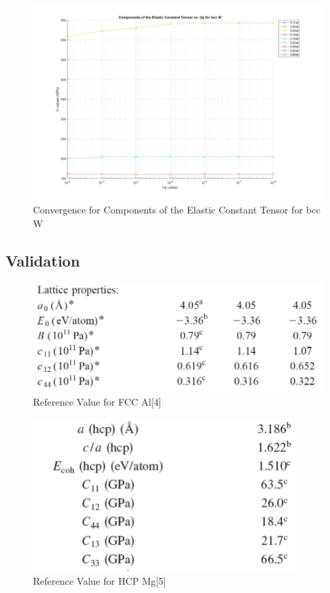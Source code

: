 \documentclass[a4paper,11pt]{article} %
\begin{document}
\begin{figure}[ht]
    \centering
    \includegraphics[width=1.1\textwidth]{W.png}
    \caption{Convergence for Components of the Elastic Constant Tensor for bcc W}
\end{figure}
\clearpage
\subsection*{Validation}



\begin{figure}[ht]
    \centering
    \includegraphics[width=1\textwidth]{Al_ref.PNG}
    \caption{Reference Value for FCC Al[4]}
\end{figure}

\begin{figure}[ht]
    \centering
    \includegraphics[width=0.9\textwidth]{Mg_ref.PNG}
    \caption{Reference Value for HCP Mg[5]}
\end{figure}
\end{document}
